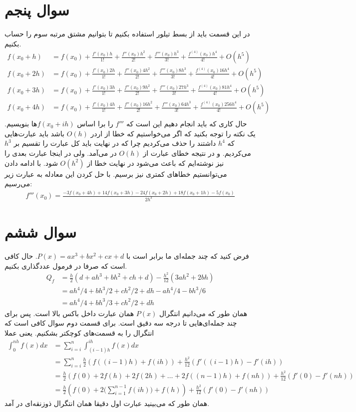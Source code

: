 \documentclass[]{article}
\begin{document}
\section*{سوال پنجم}
در این قسمت باید از بسط تیلور استفاده بکنیم تا بتوانیم مشتق مرتبه سوم را حساب بکنیم.
\begin{align*}
    f(x_0 + h)  &= f(x_0) + \frac{f'(x_0)h}{1!} + \frac{f''(x_0)h^2}{2!} + \frac{f'''(x_0)h^3}{3!} + \frac{f^{(4)}(x_0)h^4}{4!} + O(h^5)\\
    f(x_0 + 2h) &= f(x_0) + \frac{f'(x_0)2h}{1!} + \frac{f''(x_0)4h^2}{2!} + \frac{f'''(x_0)8h^3}{3!} + \frac{f^{(4)}(x_0)16h^4}{4!} + O(h^5)\\
    f(x_0 + 3h) &= f(x_0) + \frac{f'(x_0)3h}{1!} + \frac{f''(x_0)9h^2}{2!} + \frac{f'''(x_0)27h^3}{3!} + \frac{f^{(4)}(x_0)81h^4}{4!} + O(h^5)\\
    f(x_0 + 4h) &= f(x_0) + \frac{f'(x_0)4h}{1!} + \frac{f''(x_0)16h^2}{2!} + \frac{f'''(x_0)64h^3}{3!} + \frac{f^{(4)}(x_0)256h^4}{4!} + O(h^5)\\
\end{align*}
حال کاری که باید انجام دهیم این است که
$f'''$
را برا اساس
$f(x_0 + ih)$ها
بنویسیم. یک نکته را توجه بکنید که اگر می‌خواستیم که خطا از اردر
$O(h)$
باشد باید عبارت‌هایی که
$h^4$
داشتند را حذف می‌کردیم چرا که در نهایت باید کل عبارت را تقسیم بر
$h^3$
می‌کردیم. و در نتیجه خطای عبارت از
$O(h)$
در می‌آمد. ولی در اینجا عبارت بعدی را نیز نوشته‌ایم که باعث می‌شود در نهایت خطا از
$O(h^2)$
شود. با ادامه دادن می‌توانستیم خطا‌‌های کمتری نیز برسیم. با حل کردن این معادله به عبارت زیر می‌رسیم:
\begin{gather*}
    f'''(x_0) = \frac{-3f(x_0 + 4h) + 14f(x_0 + 3h) - 24f(x_0 + 2h) + 18f(x_0 + 1h) - 5f(x_0)}{2h^3}
\end{gather*}
\section*{سوال ششم}
فرض کنید که چند جمله‌ای ما برابر است با
$P(x) = ax^3 + bx^2 + cx + d$. حال کافی است که صرفا در فرمول عددگذاری بکنیم.
\begin{align*}
    Q_f &= \frac{h}{2}(d + ah^3 + bh^2 + ch + d) - \frac{h^2}{12} (3ah^2 + 2bh)\\
    &= ah^4/4 + bh^3/2 + ch^2/2 + dh - ah^4/4 - bh^3/6\\
    &= \boxed{ah^4/4 + bh^3/3 + ch^2/2 + dh}
\end{align*}
همان طور که می‌دانیم انتگرال
$P(x)$
همان عبارت داخل باکس بالا است. پس برای چند جمله‌ای‌هایی تا درجه سه دقیق است.
برای قسمت دوم سوال کافی است که انتگرال را به قسمت‌های کوچکتر بشکنیم. یعنی عملا
\begin{align*}
    \int_{0}^{nh} f(x) dx &= \sum_{i=i}^{n} \int_{(i-1)h}^{ih} f(x)dx\\
    &= \sum_{i=i}^{n} \frac{h}{2}(f((i-1)h) + f(ih)) + \frac{h^2}{12} (f'((i-1)h) - f'(ih))\\
    &= \frac{h}{2}(f(0) + 2f(h) + 2f(2h) + \dots + 2f((n - 1)h) + f(nh)) + \frac{h^2}{12} (f'(0) - f'(nh))\\
    &= \frac{h}{2}(f(0) + 2 \bigl(\sum_{i=1}^{n-1} f(ih)\bigr) + f(h)) + \frac{h^2}{12} (f'(0) - f'(nh))
\end{align*}
همان طور که می‌بینید عبارت اول دقیقا همان انتگرال ذوزنقه‌ای در آمد.
\end{document}

